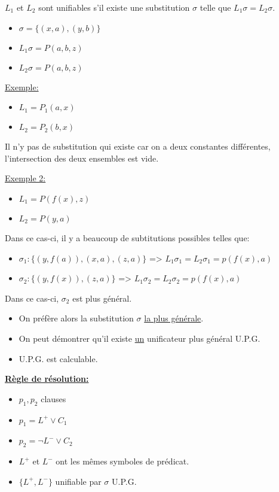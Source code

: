 \vspace{5 mm}
$L_1$ et $L_2$ sont unifiables s'il existe une substitution $\sigma$ telle que $L_1 \sigma = L_2 \sigma$.
\begin{itemize}
  \item $\sigma = \big\{(x,a),(y,b)\big\}$
  \item $L_1 \sigma = P(a,b,z)$
  \item $L_2 \sigma = P(a,b,z)$
\end{itemize}

\vspace{5 mm}
\underline{Exemple:}
\begin{itemize}
  \item $L_1 = P_1(a,x)$
  \item $L_2 = P_2(b,x)$
\end{itemize}

Il n'y pas de substitution qui existe car on a deux constantes différentes, l'intersection des deux ensembles est vide.
\smallskip

\underline{Exemple 2:}

\begin{itemize}
  \item $L_1 = P(f(x), z)$ 
  \item $L_2 = P(y, a)$
\end{itemize}

Dans ce cas-ci, il y a beaucoup de subtitutions possibles telles que:
\begin{itemize}
  \item $\sigma_1 : \big\{ (y, f(a)), (x,a), (z,a) \big\}$ => $L_1 \sigma_1 = L_2 \sigma_1 = p(f(x), a)$
  \item $\sigma_2 : \big\{ (y, f(x)), (z,a) \big\}$ \hspace{11 mm}=> $L_1 \sigma_2 = L_2 \sigma_2 = p(f(x), a)$
\end{itemize}
Dans ce cas-ci, $\sigma_2$ est plus général.\\

\smallskip
\begin{itemize}
  \item On préfère alors la substitution $\sigma$ \underline{la plus générale}.
  \item On peut démontrer qu'il existe \underline{un} unificateur plus général U.P.G.
  \item U.P.G. est calculable.
\end{itemize}

\vspace{5 mm}
\textbf{\underline{Règle de résolution:}}
\begin{itemize}
  \item $p_1, p_2$ clauses
  \item $p_1 = L^{+} \vee C_1$
  \item $p_2 = \neg L^{-} \vee C_2$
  \item $ L^{+}$ et $L^{-}$ ont les mêmes symboles de prédicat.
  \item $ \big\{L^{+}, L^{-}\big\}$ unifiable par $\sigma$ U.P.G.
\end{itemize}

